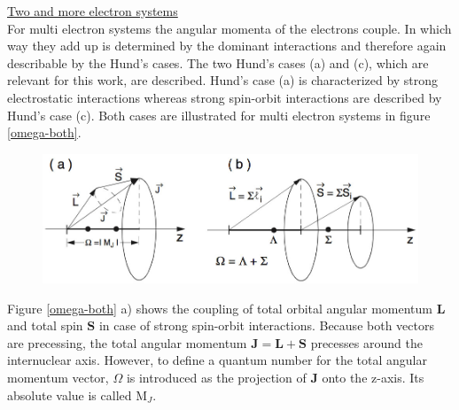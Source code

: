 \documentclass[parskip,12pt,headsepline,a4paper] {scrbook}
\begin{document}
\underline{Two and more electron systems} \\
For multi electron systems the angular momenta of the electrons couple. In which way they add up is determined by the dominant interactions and therefore again describable by the Hund's cases. The two Hund's cases (a) and (c), which are relevant for this work, are described. Hund's case (a) is characterized by strong electrostatic interactions whereas strong spin-orbit interactions are described by Hund's case (c). Both cases are illustrated for multi electron systems in figure \ref{omega-both}.

\begin{figure}[ht]
\centerline{
\includegraphics[width=14cm]{./spectroscopy/omega-molecule.jpg}}
\end{figure}

Figure \ref{omega-both} a) shows the coupling of total orbital angular momentum $\boldsymbol{L}$ and total spin $\boldsymbol{S}$ in case of strong spin-orbit interactions. Because both vectors are precessing, the total angular momentum $\boldsymbol{J} = \boldsymbol{L} + \boldsymbol{S}$ precesses around the internuclear axis. However, to define a quantum number for the total angular momentum vector, $\Omega$ is introduced as the projection of $\boldsymbol{J}$ onto the z-axis. Its absolute value is called M$_J$.
\end{document}
